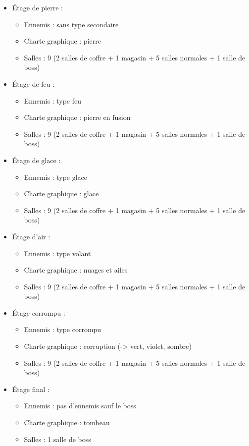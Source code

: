 \documentclass[]{extarticle}
\begin{document}
\begin{itemize}
\item Étage de pierre :
\begin{itemize}
\item Ennemis : sans type secondaire
\item Charte graphique : pierre
\item Salles : 9 (2 salles de coffre + 1 magasin + 5 salles normales + 1 salle de boss)
\end{itemize}
\bigbreak
\item Étage de feu :
\begin{itemize}
\item Ennemis : type feu
\item Charte graphique : pierre en fusion
\item Salles : 9 (2 salles de coffre + 1 magasin + 5 salles normales + 1 salle de boss)
\end{itemize}
\bigbreak
\item Étage de glace :
\begin{itemize}
\item Ennemis : type glace
\item Charte graphique : glace
\item Salles : 9 (2 salles de coffre + 1 magasin + 5 salles normales + 1 salle de boss)
\end{itemize}
\bigbreak
\item Étage d’air :
\begin{itemize}
\item Ennemis : type volant
\item Charte graphique : nuages et ailes
\item Salles : 9 (2 salles de coffre + 1 magasin + 5 salles normales + 1 salle de boss)
\end{itemize}
\bigbreak
\item Étage corrompu :
\begin{itemize}
\item Ennemis : type corrompu
\item Charte graphique : corruption (-> vert, violet, sombre)
\item Salles : 9 (2 salles de coffre + 1 magasin + 5 salles normales + 1 salle de boss)
\end{itemize}
\bigbreak
\item Étage final :
\begin{itemize}
\item Ennemis : pas d’ennemis sauf le boss
\item Charte graphique : tombeau
\item Salles : 1 salle de boss
\end{itemize}
\end{itemize}
\end{document}
